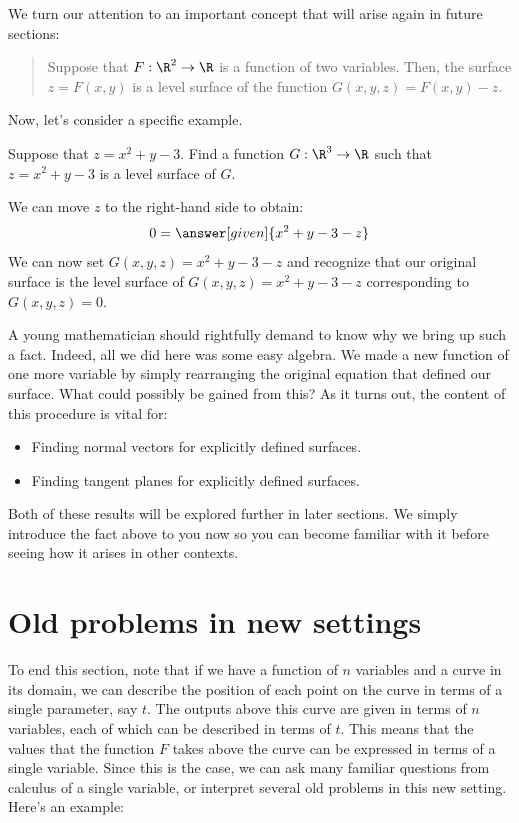 \documentclass{ximera}
\begin{document}
We turn our attention to an important concept that will arise again in
future sections:

\begin{quote}
Suppose that $F:\R^2 \to \R$ is a function of two variables.  Then, the surface $z = F(x,y)$ is a level surface of the function $G(x,y,z) = F(x,y) - z.$
\end{quote}

Now, let's consider a specific example.

\begin{example}
  Suppose that $z=x^2+y-3$. Find a function $G:\R^3\to\R$ such that
  $z=x^2+y-3$ is a level surface of $G$.
  \begin{explanation}
    We can move $z$ to the right-hand side to obtain:
    \[
    0 = \answer[given]{x^2+y-3-z}
    \]
    We can now set $G(x,y,z) = x^2+y-3-z$ and recognize that our
    original surface is the level surface of $G(x,y,z) = x^2+y-3-z$
    corresponding to $G(x,y,z)=0$.
  \end{explanation}
\end{example}

A young mathematician should rightfully demand to know why we bring up
such a fact.  Indeed, all we did here was some easy algebra.  We made
a new function of one more variable by simply rearranging the original
equation that defined our surface.  What could possibly be gained from
this?  As it turns out, the content of this procedure is vital for:
\begin{itemize}
\item Finding normal vectors for explicitly defined surfaces.
\item Finding tangent planes for explicitly defined surfaces.
\end{itemize}

Both of these results will be explored further in later sections.  We
simply introduce the fact above to you now so you can become familiar
with it before seeing how it arises in other contexts.

\section{Old problems in new settings}
To end this section, note that if we have a function of $n$ variables
and a curve in its domain, we can describe the position of each point
on the curve in terms of a single parameter, say $t$.  The outputs
above this curve are given in terms of $n$ variables, each of which
can be described in terms of $t$.  This means that the values that the
function $F$ takes above the curve can be expressed in terms of a
single variable.  Since this is the case, we can ask many familiar
questions from calculus of a single variable, or interpret several old
problems in this new setting.  Here's an example:
\end{document}
